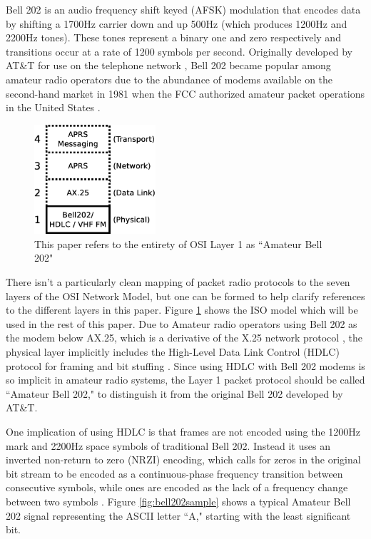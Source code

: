 Bell 202 is an audio frequency shift keyed (AFSK) modulation that
encodes data by shifting a 1700Hz carrier down and up 500Hz (which
produces 1200Hz and 2200Hz tones).
These tones represent a binary one and zero respectively and transitions occur
at a rate of 1200 symbols per second.
Originally developed by AT\&T for use on the telephone network \cite{202tspec},
Bell 202 became popular among amateur radio operators due to the abundance
of modems available on the second-hand market in 1981 when the FCC authorized
amateur packet operations in the United States \cite{gatewaypacket}.

\begin{figure}[!b]
	\centering
	\includegraphics[width=0.4\textwidth]{src/dia/osi_bell202}
	\caption{This paper refers to the entirety of OSI
	Layer 1 as ``Amateur Bell 202"}
	\label{fig:osibell}
\end{figure}

There isn't a particularly clean
mapping of packet radio protocols to the seven layers of the OSI
Network Model, but one can be formed 
to help clarify references to the different layers in this paper.
Figure \ref{fig:osibell} shows the ISO model which will be used in
the rest of this paper.
Due to Amateur radio operators
using Bell 202 as the modem below AX.25, which is a derivative of
the X.25 network protocol \cite[\S1.1]{ax25spec}, 
the physical layer implicitly includes the High-Level Data Link Control (HDLC) 
protocol for framing and bit stuffing \cite{n1vgphy}.
Since using HDLC with Bell 202 modems is so implicit in amateur radio systems, 
the Layer 1 packet protocol should be called ``Amateur Bell 202," to
distinguish it from the original Bell 202 developed by AT\&T.

One implication of using HDLC is that frames are not encoded using the
1200Hz mark and 2200Hz space symbols of traditional Bell 202.
Instead it uses an
inverted non-return to zero (NRZI) encoding,
which calls for zeros in the original bit stream to be encoded as a
continuous-phase frequency transition between consecutive symbols, 
while ones are encoded as
the lack of a frequency change between two symbols \cite{iso13239}.
Figure \ref{fig:bell202sample} shows a typical Amateur Bell 202
signal representing the ASCII letter ``A," starting with the least significant bit.

